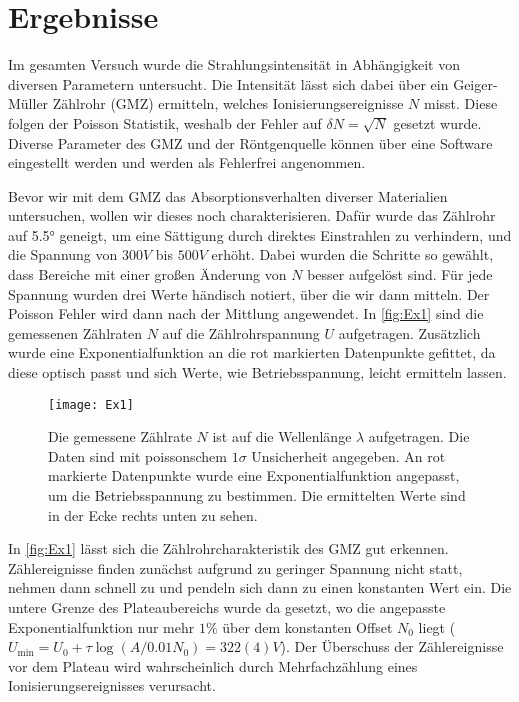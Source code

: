 \section{Ergebnisse}
Im gesamten Versuch wurde die Strahlungsintensität in Abhängigkeit von diversen Parametern untersucht. Die Intensität lässt sich dabei über ein Geiger-Müller Zählrohr (GMZ) ermitteln, welches Ionisierungsereignisse \( N \) misst. Diese folgen der Poisson Statistik, weshalb der Fehler auf \( \delta N = \sqrt{N} \) gesetzt wurde. Diverse Parameter des GMZ und der Röntgenquelle können über eine Software eingestellt werden und werden als Fehlerfrei angenommen. 

Bevor wir mit dem GMZ das Absorptionsverhalten diverser Materialien untersuchen, wollen wir dieses noch charakterisieren. Dafür wurde das Zählrohr auf \ang{5.5} geneigt, um eine Sättigung durch direktes Einstrahlen zu verhindern, und die Spannung von \( 300 \unit{V} \) bis \( 500 \unit{V} \) erhöht. Dabei wurden die Schritte so gewählt, dass Bereiche mit einer großen Änderung von \( N \) besser aufgelöst sind. Für jede Spannung wurden drei Werte händisch notiert, über die wir dann mitteln. Der Poisson Fehler wird dann nach der Mittlung angewendet. In \autoref{fig:Ex1} sind die gemessenen Zählraten $N$ auf die Zählrohrspannung $U$ aufgetragen. Zusätzlich wurde eine Exponentialfunktion an die rot markierten Datenpunkte gefittet, da diese optisch passt und sich Werte, wie Betriebsspannung, leicht ermitteln lassen.

\begin{figure}[H]
	\centering
	\texttt{[image: Ex1]}
	\caption{Die gemessene Zählrate \( N \) ist auf die Wellenlänge \( \lambda \) aufgetragen. Die Daten sind mit poissonschem \( 1\sigma \) Unsicherheit angegeben. An rot markierte Datenpunkte wurde eine Exponentialfunktion angepasst, um die Betriebsspannung zu bestimmen. Die ermittelten Werte sind in der Ecke rechts unten zu sehen.}
	\label{fig:Ex1}
\end{figure}

In \autoref{fig:Ex1} lässt sich die Zählrohrcharakteristik des GMZ gut erkennen. Zählereignisse finden zunächst aufgrund zu geringer Spannung nicht statt, nehmen dann schnell zu und pendeln sich dann zu einen konstanten Wert ein. Die untere Grenze des Plateaubereichs wurde da gesetzt, wo die angepasste Exponentialfunktion nur mehr \( 1\% \) über dem konstanten Offset \( N_0 \) liegt (\( U_{\text{min}} = U_0 + \tau\log\left( A/0.01N_0 \right) = 322(4) \unit{V} \)). Der Überschuss der Zählereignisse vor dem Plateau wird wahrscheinlich durch Mehrfachzählung eines Ionisierungsereignisses verursacht. 

